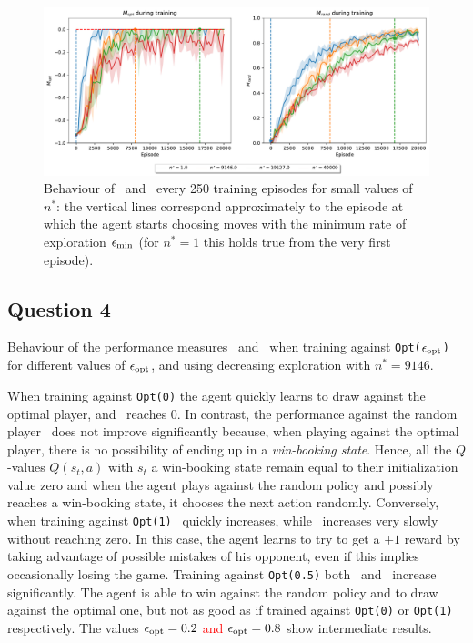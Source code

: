 \documentclass[10pt]{IEEEtran}
\begin{document}
\begin{figure}[h]
    \centering
    \includegraphics[width=\linewidth]{code/figures/performance_n_star.pdf}
    \caption{Behaviour of \mopt\  and \mrand\  every 250 training episodes for small values of $n^{*}$:  the vertical lines correspond approximately to the episode at which the agent starts choosing moves with the minimum rate of exploration $\epsilon_{\text{min}}$ (for $n^{*} = 1$ this holds true from the very first episode).}
    \label{plot_question3}
\end{figure}


\subsection*{Question 4}
Behaviour of the performance measures \mopt\  and \mrand\  when training against \texttt{Opt($\epsilon_{\text{opt}}$)} for different values of $\epsilon_{\text{opt}}$, and using decreasing exploration with $n^{*} = 9146$.

When training against \texttt{Opt(0)} the agent quickly learns to draw against the optimal player, and \mopt\  reaches 0. In contrast, the performance against the random player \mrand\  does not improve significantly because, when playing against the optimal player, there is no possibility of ending up in a \emph{win-booking state}. Hence, all the $Q$-values $Q(s_t, a)$ with $s_t$ a win-booking state remain equal to their initialization value zero and when the agent plays against the random policy and possibly reaches a win-booking state, it chooses the next action randomly. 
Conversely, when training against \texttt{Opt(1)} \mrand\  quickly increases, while \mopt\  increases very slowly without reaching zero. In this case, the agent learns to try to get a $+1$ reward by taking advantage of possible mistakes of his opponent, even if this implies occasionally losing the game. 
Training against \texttt{Opt(0.5)} both \mopt\  and \mrand\  increase significantly. The agent is able to win against the random policy and to draw against the optimal one, but not as good as if trained against \texttt{Opt(0)} or \texttt{Opt(1)} respectively. The values \textcolor{red}{$\epsilon_{\text{opt}} = 0.2$ and $\epsilon_{\text{opt}} = 0.8$} show intermediate results. 
\end{document}
